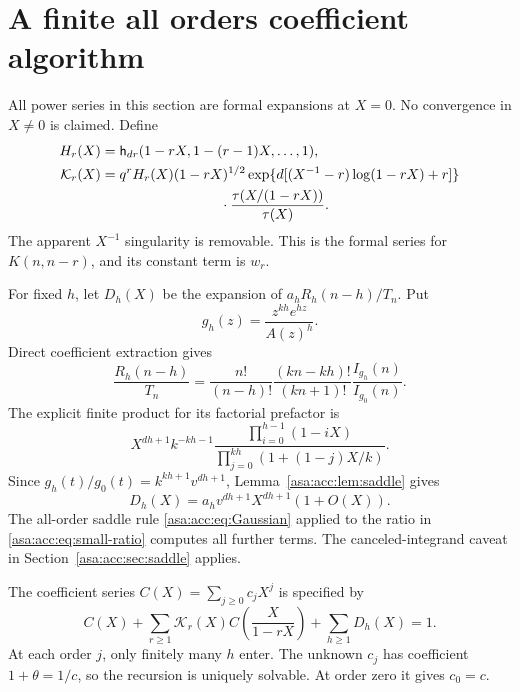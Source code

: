 \documentclass[11pt,letterpaper]{article}
\theoremstyle{remark}\newtheorem{remark}[theorem]{Remark}
\numberwithin{equation}{section}
\begin{document}
\section{A finite all orders coefficient algorithm}\label{asa:acc:sec:algorithm}
All power series in this section are formal expansions at $X=0$. No convergence in $X\ne0$ is claimed. Define
\begin{align}
H_r(X)&=\mathsf h_{dr}(1-rX,1-(r-1)X,\ldots,1),\notag\\
\mathcal K_r(X)&=q^r H_r(X)(1-rX)^{1/2}
\exp\{d[(X^{-1}-r)\log(1-rX)+r]\}\notag\\
&\hspace{30mm}\cdot\frac{\tau(X/(1-rX))}{\tau(X)}.\label{asa:acc:eq:formal-kernel}
\end{align}
The apparent $X^{-1}$ singularity is removable. This is the formal series for $K(n,n-r)$, and its constant term is $w_r$.

For fixed $h$, let $D_h(X)$ be the expansion of $a_hR_h(n-h)/T_n$. Put
\[
g_h(z)=\frac{z^{kh}e^{hz}}{A(z)^h}.
\]
Direct coefficient extraction gives
\begin{equation}\label{asa:acc:eq:small-ratio}
\frac{R_h(n-h)}{T_n}
=\frac{n!}{(n-h)!}\frac{(kn-kh)!}{(kn+1)!}
\frac{I_{g_h}(n)}{I_{g_0}(n)}.
\end{equation}
The explicit finite product for its factorial prefactor is
\begin{equation}\label{asa:acc:eq:small-factorial}
X^{dh+1}k^{-kh-1}
\frac{\prod_{i=0}^{h-1}(1-iX)}{\prod_{j=0}^{kh}(1+(1-j)X/k)}.
\end{equation}
Since $g_h(t)/g_0(t)=k^{kh+1}v^{dh+1}$, Lemma~\ref{asa:acc:lem:saddle} gives
\begin{equation}\label{asa:acc:eq:D-leading}
D_h(X)=a_hv^{dh+1}X^{dh+1}(1+O(X)).
\end{equation}
The all-order saddle rule \eqref{asa:acc:eq:Gaussian} applied to the ratio in \eqref{asa:acc:eq:small-ratio} computes all further terms. The canceled-integrand caveat in Section~\ref{asa:acc:sec:saddle} applies.

The coefficient series $C(X)=\sum_{j\ge0}c_jX^j$ is specified by
\begin{equation}\label{asa:acc:eq:formal-renewal}
C(X)+\sum_{r\ge1}\mathcal K_r(X)C\left(\frac{X}{1-rX}\right)
+\sum_{h\ge1}D_h(X)=1.
\end{equation}
At each order $j$, only finitely many $h$ enter. The unknown $c_j$ has coefficient $1+\theta=1/c$, so the recursion is uniquely solvable. At order zero it gives $c_0=c$.
\end{document}
